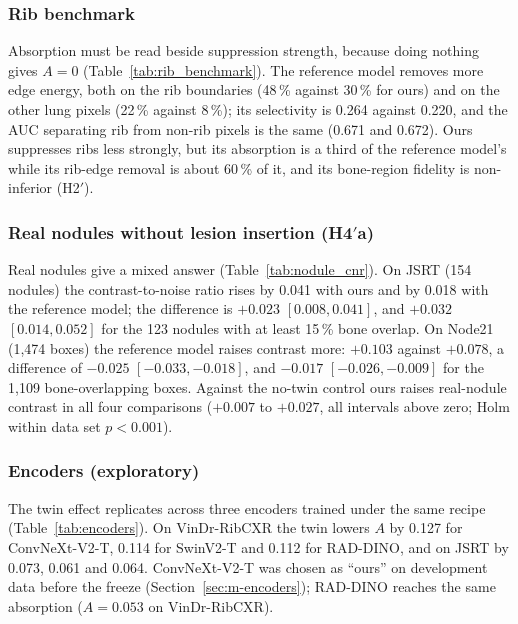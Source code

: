 \subsubsection{Rib benchmark}
Absorption must be read beside suppression strength, because doing nothing gives $A=0$ (Table~\ref{tab:rib_benchmark}). The reference model
removes more edge energy, both on the rib boundaries (48\,\% against 30\,\% for ours) and on the other lung pixels (22\,\% against 8\,\%);
its selectivity is 0.264 against 0.220, and the AUC separating rib from non-rib pixels is the same (0.671 and 0.672). Ours suppresses ribs
less strongly, but its absorption is a third of the reference model's while its rib-edge removal is about 60\,\% of it, and its bone-region
fidelity is non-inferior (H2$'$).

\begin{table}[!t]
\centering
\caption{Rib benchmark on VinDr-RibCXR (metrics only): gradient-energy reduction on rib-boundary pixels and on other lung pixels,
selectivity and AUC.}
\label{tab:rib_benchmark}
\end{table}

\subsubsection{Real nodules without lesion insertion (H4$'$a)}
Real nodules give a mixed answer (Table~\ref{tab:nodule_cnr}). On JSRT (154 nodules) the contrast-to-noise ratio rises by 0.041 with ours
and by 0.018 with the reference model; the difference is $+0.023$ $[0.008,0.041]$, and $+0.032$ $[0.014,0.052]$ for the 123 nodules with at
least 15\,\% bone overlap. On Node21 (1,474 boxes) the reference model raises contrast more: $+0.103$ against $+0.078$, a difference of
$-0.025$ $[-0.033,-0.018]$, and $-0.017$ $[-0.026,-0.009]$ for the 1,109 bone-overlapping boxes. Against the no-twin control ours raises
real-nodule contrast in all four comparisons ($+0.007$ to $+0.027$, all intervals above zero; Holm within data set $p<0.001$).

\begin{table}[!t]
\centering
\caption{Contrast-to-noise change of real nodules on JSRT and Node21 (soft-tissue image minus original), all lesions and lesions with at
least 15\,\% bone overlap; image-cluster bootstrap intervals.}
\label{tab:nodule_cnr}
\end{table}

\subsubsection{Encoders (exploratory)}
The twin effect replicates across three encoders trained under the same recipe (Table~\ref{tab:encoders}). On VinDr-RibCXR the twin lowers
$A$ by 0.127 for ConvNeXt-V2-T, 0.114 for SwinV2-T and 0.112 for RAD-DINO, and on JSRT by 0.073, 0.061 and 0.064. ConvNeXt-V2-T was chosen
as ``ours'' on development data before the freeze (Section~\ref{sec:m-encoders}); RAD-DINO reaches the same absorption ($A=0.053$ on
VinDr-RibCXR).


